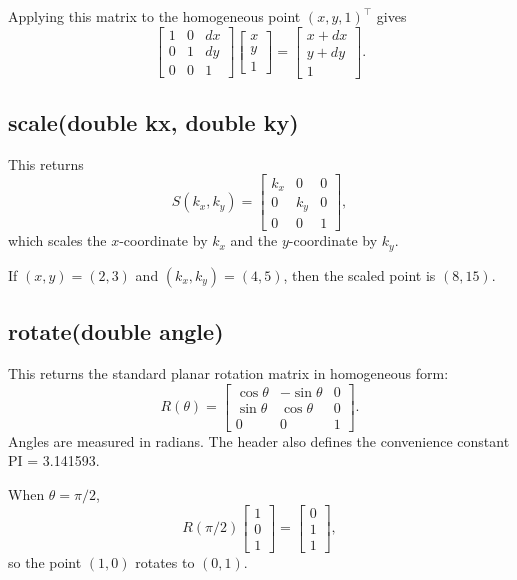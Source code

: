 \documentclass[11pt,a4paper,openany]{book}
\def\code#1{#1}%
\DeclareRobustCommand{\code}[1]{\texttt{\detokenize{#1}}}
\begin{document}
\begin{examplebox}[Example]
Applying this matrix to the homogeneous point \((x,y,1)^\top\) gives
\[
\begin{bmatrix}
1 & 0 & dx \\
0 & 1 & dy \\
0 & 0 & 1
\end{bmatrix}
\begin{bmatrix}
x \\ y \\ 1
\end{bmatrix}
=
\begin{bmatrix}
x + dx \\ y + dy \\ 1
\end{bmatrix}.
\]
\end{examplebox}

\subsection{\code{scale(double kx, double ky)}}
This returns
\[
S(k_x,k_y) =
\begin{bmatrix}
k_x & 0 & 0 \\
0 & k_y & 0 \\
0 & 0 & 1
\end{bmatrix},
\]
which scales the \(x\)-coordinate by \(k_x\) and the \(y\)-coordinate by \(k_y\).

\begin{examplebox}[Example]
If \((x,y)=(2,3)\) and \((k_x,k_y)=(4,5)\), then the scaled point is \((8,15)\).
\end{examplebox}

\subsection{\code{rotate(double angle)}}
This returns the standard planar rotation matrix in homogeneous form:
\[
R(\theta) =
\begin{bmatrix}
\cos\theta & -\sin\theta & 0 \\
\sin\theta & \cos\theta & 0 \\
0 & 0 & 1
\end{bmatrix}.
\]
Angles are measured in radians. The header also defines the convenience constant \code{PI = 3.141593}.

\begin{examplebox}[Example]
When \(\theta=\pi/2\),
\[
R(\pi/2)
\begin{bmatrix}
1 \\ 0 \\ 1
\end{bmatrix}
=
\begin{bmatrix}
0 \\ 1 \\ 1
\end{bmatrix},
\]
so the point \((1,0)\) rotates to \((0,1)\).
\end{examplebox}
\end{document}
